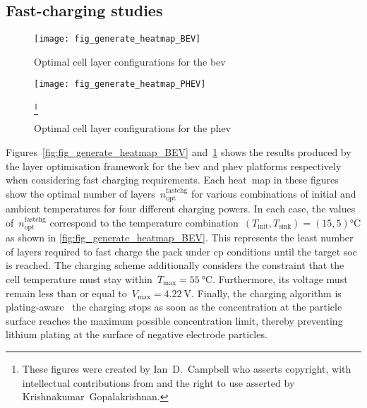 \subsection{Fast-charging studies}

\begin{figure}[p]
    \begin{minipage}[t]{\textwidth}
        \centering
        \texttt{[image: fig\_generate\_heatmap\_BEV]}
        \captionsetup{labelsep=note}
        \caption[Optimal cell layer configurations for the  for a range of fast charging powers and thermal conditions]{Optimal cell layer configurations for the \gls{bev}}
        \label{fig:fig_generate_heatmap_BEV}
        \setcounter{footnote}{8}
        \vspace*{\floatsep}
        \texttt{[image: fig\_generate\_heatmap\_PHEV]}
        \caption[Optimal cell layer configurations for the  for a range of
        fast charging powers and thermal conditions]{Optimal cell layer configurations for the \gls{phev}}
        \label{fig:fig_generate_heatmap_PHEV}
        \mpfootnotes[1]
        \footnote{These figures were created by \mbox{Ian D.\ Campbell} who asserts copyright,
            with intellectual contributions from and the right to use asserted by
        \mbox{Krishnakumar Gopalakrishnan}.}
    \end{minipage}
\end{figure}

Figures~\ref{fig:fig_generate_heatmap_BEV}
and~\ref{fig:fig_generate_heatmap_PHEV} shows the results  produced by the layer
optimisation framework  for the \gls{bev} and  \gls{phev} platforms respectively
when  considering fast  charging requirements.  Each heat~map  in these  figures
show  the optimal  number  of  layers~$n^\text{fastchg}_\text{opt}$ for  various
combinations of  initial and  ambient temperatures  for four  different charging
powers. In each case, the  values of~$n^\text{fastchg}_\text{opt}$ correspond to
the  temperature  combination~${(T_\text{init},T_\text{sink})  =  (15,  5)
\si{\degreeCelsius}}$  as  shown  in  \cref{fig:fig_generate_heatmap_BEV}.  This
represents the  least number of  layers required to  fast charge the  pack under
\gls{cp} conditions until  the target \gls{soc} is reached.  The charging scheme
additionally considers the constraint that the cell temperature must stay
within~${T_\text{max}=  \SI{55}{\degreeCelsius}}$. Furthermore,  its voltage  must
remain less than or equal  to~${V_\text{max} = \SI{4.22}{\volt}}$. Finally,
the charging algorithm is plating-aware \ie~the charging stops as soon as the
concentration at the particle surface reaches the maximum possible concentration
limit, thereby preventing  lithium plating at the surface  of negative electrode
particles.


